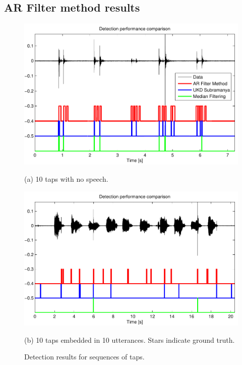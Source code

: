 \subsection{AR Filter method results}

\begin{figure}
\begin{minipage}[b]{1.0\linewidth}
  \centering
  \centerline{\includegraphics[width=12.5cm]{ARFiltCompareLongTaps.pdf}}
  \centerline{(a) 10 taps with no speech.}\medskip
\end{minipage}
%
\begin{minipage}[b]{1.0\linewidth}
  \centering
  \centerline{\includegraphics[width=12.5cm]{ARFiltCompareLongTapsnTalk.pdf}}
  \centerline{(b) 10 taps embedded in 10 utterances. Stars indicate ground truth.}\medskip
\end{minipage}
\hfill
%
\caption{Detection results for sequences of taps.}
\label{fig:ARFilterDetectionResults}
\end{figure}

